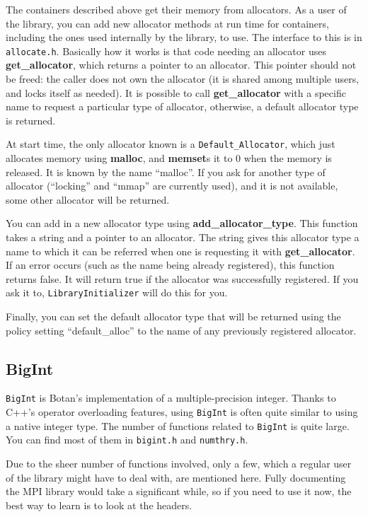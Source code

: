 \documentclass{article}
\newcommand{\filename}[1]{\texttt{#1}}
\newcommand{\function}[1]{\textbf{#1}}
\newcommand{\type}[1]{\texttt{#1}}
\begin{document}
The containers described above get their memory from allocators. As a user of
the library, you can add new allocator methods at run time for containers,
including the ones used internally by the library, to use. The interface to
this is in \filename{allocate.h}. Basically how it works is that code needing
an allocator uses \function{get\_allocator}, which returns a pointer to an
allocator. This pointer should not be freed: the caller does not own the
allocator (it is shared among multiple users, and locks itself as needed). It
is possible to call \function{get\_allocator} with a specific name to request a
particular type of allocator, otherwise, a default allocator type is returned.

At start time, the only allocator known is a \type{Default\_Allocator}, which
just allocates memory using \function{malloc}, and \function{memset}s it to 0
when the memory is released. It is known by the name ``malloc''. If you ask for
another type of allocator (``locking'' and ``mmap'' are currently used), and it
is not available, some other allocator will be returned.

You can add in a new allocator type using \function{add\_allocator\_type}. This
function takes a string and a pointer to an allocator. The string gives this
allocator type a name to which it can be referred when one is requesting it
with \function{get\_allocator}. If an error occurs (such as the name being
already registered), this function returns false. It will return true if the
allocator was successfully registered. If you ask it to,
\type{LibraryInitializer} will do this for you.

Finally, you can set the default allocator type that will be returned using
the policy setting ``default\_alloc'' to the name of any previously registered
allocator.

\subsection{BigInt}

\type{BigInt} is Botan's implementation of a multiple-precision
integer. Thanks to C++'s operator overloading features, using \type{BigInt} is
often quite similar to using a native integer type. The number of functions
related to \type{BigInt} is quite large. You can find most of them in
\filename{bigint.h} and \filename{numthry.h}.

Due to the sheer number of functions involved, only a few, which a regular user
of the library might have to deal with, are mentioned here. Fully documenting
the MPI library would take a significant while, so if you need to use it now,
the best way to learn is to look at the headers.
\end{document}
